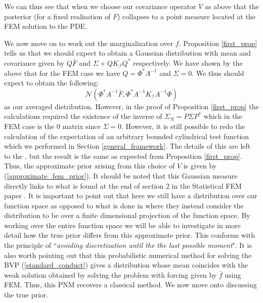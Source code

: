 We can thus see that when we choose our covariance operator $V$ as above that the posterior (for a fixed realisation of $F$) collapses to a point measure located at the FEM solution to the PDE.

We now move on to work out the marginalization over $f$. Proposition \textcolor{blue}{\ref{first_prop}} tells us that we should expect to obtain a Gaussian distribution with mean and covariance given by $Q\bar{F}$ and $\Sigma+QK_{\mathcal{I}}Q^{*}$ respectively. We have shown by the above that for the FEM case we have $Q=\Phi^{*}A^{-1}$ and $\Sigma=0$. We thus should expect to obtain the following:
\begin{equation}
    \label{approximate_fem_prior}
    \mathcal{N}(\Phi^{*}A^{-1}\bar{F},\Phi^{*}A^{-1}K_{\mathcal{I}}A^{-1}\Phi)
\end{equation}
as our averaged distribution. However, in the proof of Proposition \textcolor{blue}{\ref{first_prop}} the calculations required the existence of the inverse of $\Sigma_{N}=P\Sigma P^{*}$ which in the FEM case is the $0$ matrix since $\Sigma=0$. However, it is still possible to redo the calculation of the expectation of an arbitrary bounded cylindrical test function which we performed in Section \textcolor{blue}{\ref{general_framework}}. The details of this are left to the \textcolor{blue}{}, but the result is the same as expected from Proposition \textcolor{blue}{\ref{first_prop}}. Thus, the approximate prior arising from this choice of $V$ is given by (\ref{approximate_fem_prior}). It should be noted that this Gaussian measure directly links to what is found at the end of section 2 in the Statistical FEM paper \textcolor{blue}{\citep{girolami2019statistical}}. It is important to point out that here we still have a distribution over our function space as opposed to what is done in \textcolor{blue}{\citep{girolami2019statistical}} where they instead consider the distribution to be over a finite dimensional projection of the function space. By working over the entire function space we will be able to investigate in more detail how the true prior differs from this approximate prior. This conforms with the principle of ``\textit{avoiding discretization until the the last possible moment}". It is also worth pointing out that this probabilistic numerical method for solving the BVP (\ref{standard_conduct}) gives a distribution whose mean coincides with the weak solution obtained by solving the problem with forcing given by $\bar{f}$ using FEM. Thus, this PNM recovers a classical method. We now move onto discussing the true prior.

